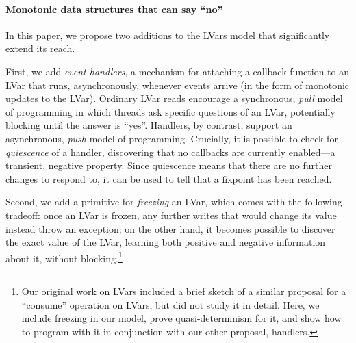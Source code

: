 \paragraph{Monotonic data structures that can say ``no''}

In this paper, we propose two additions to the LVars model that significantly
extend its reach.

First, we add \emph{event handlers}, a mechanism for attaching a callback
function to an LVar that runs, asynchronously, whenever events arrive (in the
form of monotonic updates to the LVar).  Ordinary LVar reads encourage a
synchronous, \emph{pull} model of programming in which threads ask specific
questions of an LVar, potentially blocking until the answer is ``yes''.
Handlers, by contrast, support an asynchronous, \emph{push} model of
programming.  Crucially, it is possible to check for \emph{quiescence} of a
handler, discovering that no callbacks are currently enabled---a transient,
negative property.  Since quiescence means that there are no further changes to
respond to, it can be used to tell that a fixpoint has been reached.


Second, we add a primitive for \emph{freezing} an LVar, which comes with the
following tradeoff: once an LVar is frozen, any further writes that would change
its value instead throw an exception; on the other hand, it becomes possible to
discover the exact value of the LVar, learning both positive and negative
information about it, without blocking.\footnote{Our original work on LVars
\cite{LVars-paper}
  included a brief sketch of a similar proposal for a ``consume'' operation on
  LVars, but did not study it in detail.  Here, we include freezing in our
  model, prove quasi-determinism for it, and show how to program with it in
  conjunction with our other proposal, handlers.}



